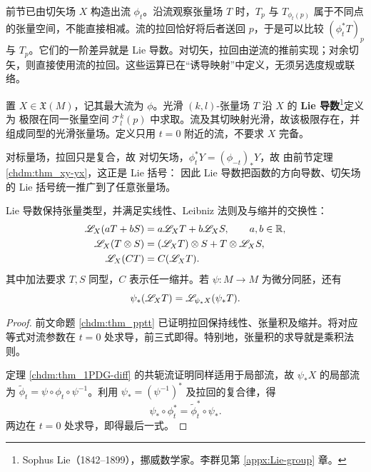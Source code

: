 前节已由切矢场 $X$ 构造出流 $\phi_t$。沿流观察张量场 $T$ 时，$T_p$ 与 $T_{\phi_t(p)}$ 属于不同点的张量空间，不能直接相减。流的拉回恰好将后者送回 $p$，于是可以比较 $(\phi_t^*T)_p$ 与 $T_p$。它们的一阶差异就是 Lie 导数。对切矢，拉回由逆流的推前实现；对余切矢，则直接使用流的拉回。这些运算已在“诱导映射”中定义，无须另选度规或联络。

\begin{definition}
    置 $X\in\mathfrak X(M)$，记其最大流为 $\phi$。光滑 $(k,l)$-张量场 $T$ 沿 $X$ 的 \textbf{Lie 导数}\footnote{Sophus Lie（1842--1899），挪威数学家。李群见第 \ref{appx:Lie-group} 章。}定义为
    极限在同一张量空间 $\mathcal T^k_l(p)$ 中求取。流及其切映射光滑，故该极限存在，并组成同型的光滑张量场。定义只用 $t=0$ 附近的流，不要求 $X$ 完备。
\end{definition}

对标量场，拉回只是复合，故
对切矢场，$\phi_t^*Y=(\phi_{-t})_*Y$，故
由前节定理 \ref{chdm:thm_xy-yx}，这正是 Lie 括号：
因此 Lie 导数把函数的方向导数、切矢场的 Lie 括号统一推广到了任意张量场。

\begin{theorem}
    Lie 导数保持张量类型，并满足实线性、Leibniz 法则及与缩并的交换性：
    \[
    \begin{aligned}
        \mathscr{L}_X(aT+bS)&=a\mathscr{L}_XT+b\mathscr{L}_XS,\qquad a,b\in\mathbb{R},\\
        \mathscr{L}_X(T\otimes S)&=(\mathscr{L}_XT)\otimes S+T\otimes\mathscr{L}_XS,\\
        \mathscr{L}_X(CT)&=C(\mathscr{L}_XT).
    \end{aligned}
    \]
    其中加法要求 $T,S$ 同型，$C$ 表示任一缩并。若 $\psi:M\to M$ 为微分同胚，还有
    \[
        \psi_*(\mathscr{L}_XT)=\mathscr{L}_{\psi_*X}(\psi_*T).
    \]
\end{theorem}
\begin{proof}
    前文命题 \ref{chdm:thm_pptt} 已证明拉回保持线性、张量积及缩并。将对应等式对流参数在 $t=0$ 处求导，前三式即得。特别地，张量积的求导就是乘积法则。

    定理 \ref{chdm:thm_1PDG-diff} 的共轭流证明同样适用于局部流，故 $\psi_*X$ 的局部流为 $\tilde\phi_t=\psi\circ\phi_t\circ\psi^{-1}$。利用 $\psi_*=(\psi^{-1})^*$ 及拉回的复合律，得
    \[
        \psi_*\circ\phi_t^*=\tilde\phi_t^*\circ\psi_*.
    \]
    两边在 $t=0$ 处求导，即得最后一式。
\end{proof}

